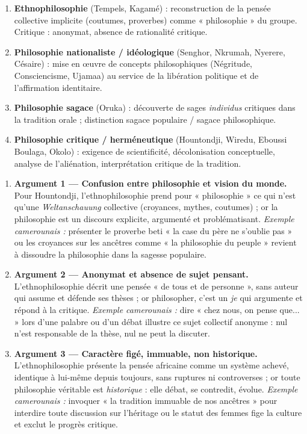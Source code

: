 \documentclass[11pt]{article}
\begin{document}
\begin{aretenir}
\begin{enumerate}
    \item \textbf{Ethnophilosophie} (Tempels, Kagamé) : reconstruction de la pensée collective implicite (coutumes, proverbes) comme « philosophie » du groupe. Critique : anonymat, absence de rationalité critique.
    \item \textbf{Philosophie nationaliste / idéologique} (Senghor, Nkrumah, Nyerere, Césaire) : mise en œuvre de concepts philosophiques (Négritude, Consciencisme, Ujamaa) au service de la libération politique et de l'affirmation identitaire.
    \item \textbf{Philosophie sagace} (Oruka) : découverte de sages \emph{individus} critiques dans la tradition orale ; distinction sagace populaire / sagace philosophique.
    \item \textbf{Philosophie critique / herméneutique} (Hountondji, Wiredu, Eboussi Boulaga, Okolo) : exigence de scientificité, décolonisation conceptuelle, analyse de l'aliénation, interprétation critique de la tradition.
\end{enumerate}
\end{aretenir}

\begin{corrige}
\begin{enumerate}
    \item \textbf{Argument 1 — Confusion entre philosophie et vision du monde.} Pour Hountondji, l'ethnophilosophie prend pour « philosophie » ce qui n'est qu'une \emph{Weltanschauung} collective (croyances, mythes, coutumes) ; or la philosophie est un discours explicite, argumenté et problématisant. \emph{Exemple camerounais :} présenter le proverbe beti « la case du père ne s'oublie pas » ou les croyances sur les ancêtres comme « la philosophie du peuple » revient à dissoudre la philosophie dans la sagesse populaire.
    \item \textbf{Argument 2 — Anonymat et absence de sujet pensant.} L'ethnophilosophie décrit une pensée « de tous et de personne », sans auteur qui assume et défende ses thèses ; or philosopher, c'est un \emph{je} qui argumente et répond à la critique. \emph{Exemple camerounais :} dire « chez nous, on pense que... » lors d'une palabre ou d'un débat illustre ce sujet collectif anonyme : nul n'est responsable de la thèse, nul ne peut la discuter.
    \item \textbf{Argument 3 — Caractère figé, immuable, non historique.} L'ethnophilosophie présente la pensée africaine comme un système achevé, identique à lui-même depuis toujours, sans ruptures ni controverses ; or toute philosophie véritable est \emph{historique} : elle débat, se contredit, évolue. \emph{Exemple camerounais :} invoquer « la tradition immuable de nos ancêtres » pour interdire toute discussion sur l'héritage ou le statut des femmes fige la culture et exclut le progrès critique.
\end{enumerate}
\end{corrige}
\end{document}
